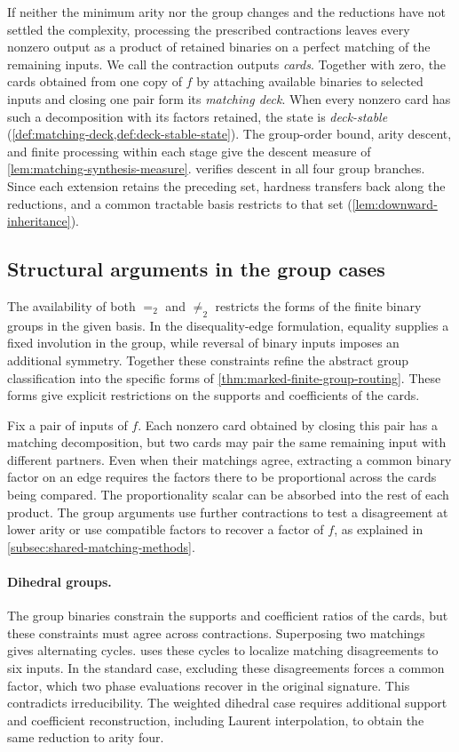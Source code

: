 \documentclass[11pt,letterpaper,onecolumn]{article}
\theoremstyle{plain}
\theoremstyle{definition}
\theoremstyle{remark}
\newcommand{\Eq}{=}
\newcommand{\Neq}{\neq}
\begin{document}
If neither the minimum arity nor the group changes and the reductions have
not settled the complexity, processing the prescribed contractions leaves
every nonzero output as a product of retained binaries on a perfect matching
of the remaining inputs. We call the contraction outputs \emph{cards}.
Together with zero, the cards obtained from one copy of \(f\) by attaching
available binaries to selected inputs and closing one pair form its
\emph{matching deck}. When every nonzero card has such a decomposition
with its factors retained, the state is \emph{deck-stable}
(\cref{def:matching-deck,def:deck-stable-state}).
The group-order bound, arity descent, and finite processing within each
stage give the descent measure of \cref{lem:matching-synthesis-measure}.
 verifies descent in all four group branches.
Since each extension retains the preceding
set, hardness transfers back along the reductions, and a common tractable
basis restricts to that set (\cref{lem:downward-inheritance}).

\subsection{Structural arguments in the group cases}
\label{subsec:intro-group-arguments}

The availability of both \(\Eq_2\) and \(\Neq_2\) restricts the
forms of the finite binary groups in the given basis.
In the disequality-edge formulation, equality supplies a fixed
involution in the group, while reversal of binary inputs imposes
an additional symmetry.  Together these constraints refine the
abstract group classification into the specific forms of
\cref{thm:marked-finite-group-routing}.  These forms give explicit
restrictions on the supports and coefficients of the cards.

Fix a pair of inputs of \(f\). Each nonzero card obtained by closing this
pair has a matching decomposition, but two cards may pair the same remaining
input with different partners. Even when their matchings agree, extracting
a common binary factor on an edge requires the factors there to be proportional
across the cards being compared. The proportionality scalar can be absorbed
into the rest of each product. The group arguments use further contractions
to test a disagreement at lower arity or use compatible factors to recover
a factor of \(f\), as explained in \cref{subsec:shared-matching-methods}.

\paragraph{Dihedral groups.}
The group binaries constrain the supports and coefficient ratios
of the cards, but these constraints must agree across contractions.
Superposing two matchings gives alternating cycles. 
uses these cycles to localize matching disagreements to six inputs. In the standard case, excluding these
disagreements forces a common factor, which two phase evaluations
recover in the original signature. This contradicts irreducibility.
The weighted dihedral case requires additional support and
coefficient reconstruction, including Laurent interpolation, to obtain
the same reduction to arity four.
\end{document}
